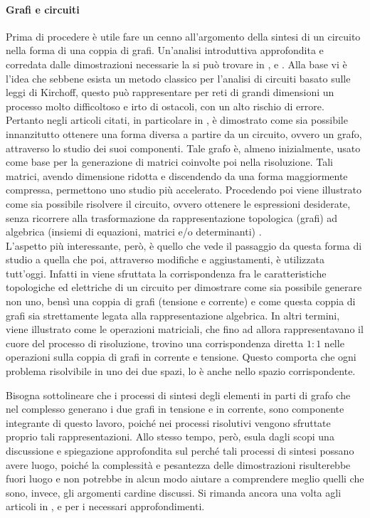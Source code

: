 \paragraph{Grafi e circuiti}
Prima di procedere è utile fare un cenno all'argomento della sintesi di un circuito nella forma di una coppia di grafi. Un'analisi introduttiva approfondita e corredata dalle dimostrazioni necessarie la si può trovare in \cite{Percival1}, \cite{Percival2} e \cite{Percival3}. Alla base vi è l'idea che sebbene esista un metodo classico per l'analisi di circuiti basato sulle leggi di Kirchoff, questo può rappresentare per reti di grandi dimensioni un processo molto difficoltoso e irto di ostacoli, con un alto rischio di errore. Pertanto negli articoli citati, in particolare in \cite{Percival1}, è dimostrato come sia possibile innanzitutto ottenere una forma diversa a partire da un circuito, ovvero un grafo, attraverso lo studio dei suoi componenti. Tale grafo è, almeno inizialmente, usato come base per la generazione di matrici coinvolte poi nella risoluzione. Tali matrici, avendo dimensione ridotta e discendendo da una forma maggiormente compressa, permettono uno studio più accelerato. Procedendo poi viene illustrato come sia possibile risolvere il circuito, ovvero ottenere le espressioni desiderate, senza ricorrere alla trasformazione da rappresentazione topologica (grafi) ad algebrica (insiemi di equazioni, matrici e/o determinanti) \cite{Percival2}.\\
L'aspetto più interessante, però, è quello che vede il passaggio da questa forma di studio a quella che poi, attraverso modifiche e aggiustamenti, è utilizzata tutt'oggi. Infatti in \cite{Percival3} viene sfruttata la corrispondenza fra le caratteristiche topologiche ed elettriche di un circuito per dimostrare come sia possibile generare non uno, bensì una coppia di grafi (tensione e corrente) e come questa coppia di grafi sia strettamente legata alla rappresentazione algebrica. In altri termini, viene illustrato come le operazioni matriciali, che fino ad allora rappresentavano il cuore del processo di risoluzione, trovino una corrispondenza diretta $1:1$ nelle operazioni sulla coppia di grafi in corrente e tensione. Questo comporta che ogni problema risolvibile in uno dei due spazi, lo è anche nello spazio corrispondente.

Bisogna sottolineare che i processi di sintesi degli elementi in parti di grafo che nel complesso generano i due grafi in tensione e in corrente, sono componente integrante di questo lavoro, poiché nei processi risolutivi vengono sfruttate proprio tali rappresentazioni. Allo stesso tempo, però, esula dagli scopi una discussione e spiegazione approfondita sul perché tali processi di sintesi possano avere luogo, poiché la complessità e pesantezza delle dimostrazioni risulterebbe fuori luogo e non potrebbe in alcun modo aiutare a comprendere meglio quelli che sono, invece, gli argomenti cardine discussi. Si rimanda ancora una volta agli articoli in \cite{Percival1}, \cite{Percival2} e \cite{Percival3} per i necessari approfondimenti.

